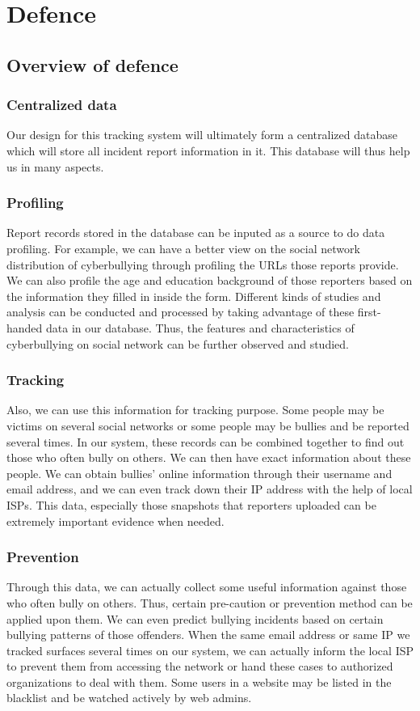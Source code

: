 \section{Defence}
\subsection{Overview of defence}
\subsubsection{Centralized data}

Our design for this tracking system will ultimately form a centralized database which will store all incident report information in it. This database will thus help us in many aspects.

\subsubsection{Profiling}
Report records stored in the database can be inputed as a source to do data profiling. For example, we can have a better view on the social network distribution of cyberbullying through profiling the URLs those reports provide. We can also profile the age and education background of those reporters based on the information they filled in inside the form. Different kinds of studies and analysis can be conducted and processed by taking advantage of these first-handed data in our database. Thus, the features and characteristics of cyberbullying on social network can be further observed and studied. 

\subsubsection{Tracking}
Also, we can use this information for tracking purpose. Some people may be victims on several social networks or some people may be bullies and be reported several times. In our system, these records can be combined together to find out those who often bully on others. We can then have exact information about these people. We can obtain bullies' online information through their username and email address, and we can even track down their IP address with the help of local ISPs. This data, especially those snapshots that reporters uploaded can be extremely important evidence when needed. 

\subsubsection{Prevention}
Through this data, we can actually collect some useful information against those who often bully on others. Thus, certain pre-caution or prevention method can be applied upon them. We can even predict bullying incidents based on certain bullying patterns of those offenders. When the same email address or same IP we tracked surfaces several times on our system, we can actually inform the local ISP to prevent them from accessing the network or hand these cases to authorized organizations to deal with them. Some users in a website may be listed in the blacklist and be watched actively by web admins.

